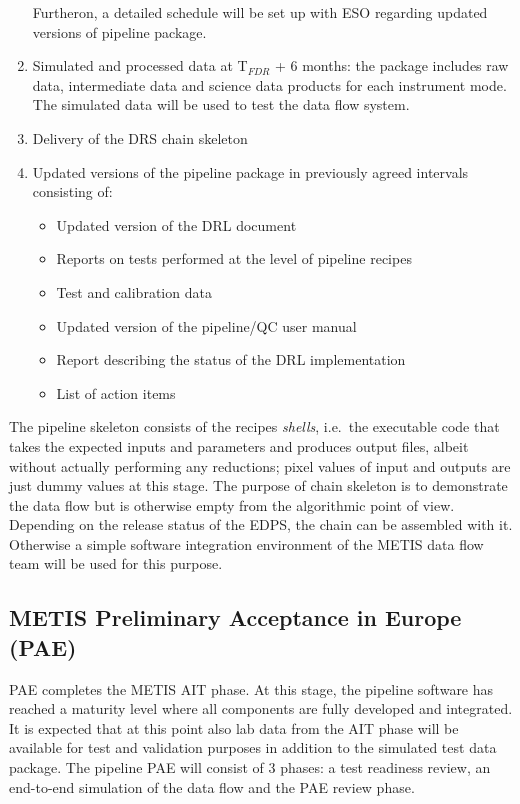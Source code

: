 \begin{enumerate}
    Furtheron, a detailed schedule will be set up with ESO regarding updated versions of pipeline package.
    \item Simulated and processed data at T$_{FDR}$ + 6 months: the package includes raw data, intermediate data and science data products for each instrument mode. The simulated data will be used to test the data flow system.
    \item Delivery of the DRS chain skeleton
    \item Updated versions of the pipeline package in previously agreed intervals consisting of:
    \begin{itemize}
        \item Updated version of the DRL document
        \item Reports on tests performed at the level of pipeline recipes
        \item Test and calibration data
        \item Updated version of the pipeline/QC user manual
        \item Report describing the status of the DRL implementation
        \item List of action items
    \end{itemize}
\end{enumerate}

The pipeline skeleton consists of the recipes \emph{shells}, i.e.~the executable
code that takes the expected inputs and parameters and produces output files,
albeit without actually performing any reductions; pixel values of input and
outputs are just dummy values at this stage. The purpose of chain skeleton is to
demonstrate the data flow but is otherwise empty from the algorithmic point of
view. Depending on the release status of the \ac{EDPS}, the chain can be
assembled with it. Otherwise a simple software integration environment of the
METIS data flow team will be used for this purpose. 


\subsection{METIS Preliminary Acceptance in Europe (PAE)}
\label{ssec:pae_europe}

PAE completes the METIS AIT phase. At this stage, the pipeline software has reached a maturity level where all components are fully developed and integrated. It is expected that at this point also lab data from the AIT phase will be available for test and validation purposes in addition to the simulated test data package. The pipeline PAE will consist of 3 phases: a test readiness review, an end-to-end simulation of the data flow and the PAE review phase.

